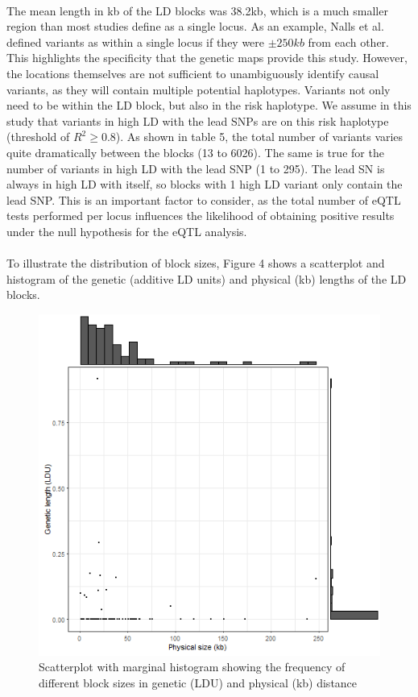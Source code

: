 \documentclass{article}
\begin{document}
\\The mean length in kb of the LD blocks was 38.2kb, which is a much smaller region than most studies define as a single locus. As an example, Nalls et al.\cite{Nalls2019IdentificationStudies} defined variants as within a single locus if they were $\pm 250kb$ from each other. This highlights the specificity that the genetic maps provide this study. However, the locations themselves are not sufficient to unambiguously identify causal variants, as they will contain multiple potential haplotypes. Variants not only need to be within the LD block, but also in the risk haplotype. We assume in this study that variants in high LD with the lead SNPs are on this risk haplotype (threshold of $R^2 \geq 0.8$). As shown in table 5, the total number of variants varies quite dramatically between the blocks (13 to 6026). The same is true for the number of variants in high LD with the lead SNP (1 to 295). The lead SN is always in high LD with itself, so blocks with 1 high LD variant only contain the lead SNP. This is an important factor to consider, as  the total number of eQTL tests performed per locus influences the likelihood of obtaining positive results under the null hypothesis for the eQTL analysis. 
\\
\\To illustrate the distribution of block sizes, Figure 4 shows a scatterplot and histogram of the genetic (additive LD units) and physical (kb) lengths of the LD blocks.
\begin{figure}[!h]
    \centering
    \includegraphics[width=1\linewidth]{Thesis/thesis images/blockscatter.png}
    \caption{Scatterplot with marginal histogram showing the frequency of different block sizes in genetic (LDU) and physical (kb) distance}
    \label{fig:blockscatter}
\end{figure}
\end{document}
